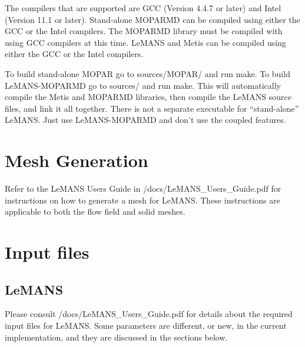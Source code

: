 \documentclass[]{article}
\begin{document}
The compilers that are supported are GCC (Version 4.4.7 or later) and Intel (Version 11.1 or later).  Stand-alone MOPARMD can be compiled using either the GCC or the Intel compilers.  The MOPARMD library must be compiled with using GCC compilers at this time.  LeMANS and Metis can be compiled using either the GCC or the Intel compilers.

To build stand-alone MOPAR go to sources/MOPAR/ and run make.  To build LeMANS-MOPARMD go to sources/ and run make. This will automatically compile the Metis and MOPARMD libraries, then compile the LeMANS source files, and link it all together.  There is not a separate executable for ``stand-alone'' LeMANS. Just use LeMANS-MOPARMD and don't use the coupled features.\\

\section{Mesh Generation}

Refer to the LeMANS Users Guide in /docs/LeMANS\_Users\_Guide.pdf for instructions on how to generate a mesh for LeMANS.  These instructions are applicable to both the flow field and solid meshes.

\section{Input files}

\subsection{LeMANS}

Please consult /docs/LeMANS\_Users\_Guide.pdf for details about the required input files for LeMANS.  Some parameters are different, or new, in the current implementation, and they are discussed in the sections below.
\end{document}
